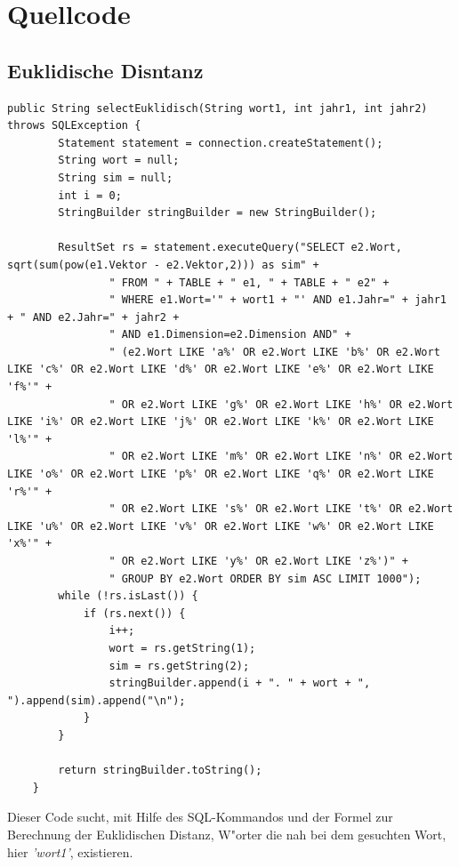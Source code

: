 \section{Quellcode}

\subsection{Euklidische Disntanz}
\begin{lstlisting}[style=Java]
    public String selectEuklidisch(String wort1, int jahr1, int jahr2) throws SQLException {
        Statement statement = connection.createStatement();
        String wort = null;
        String sim = null;
        int i = 0;
        StringBuilder stringBuilder = new StringBuilder();
        
        ResultSet rs = statement.executeQuery("SELECT e2.Wort, sqrt(sum(pow(e1.Vektor - e2.Vektor,2))) as sim" +
                " FROM " + TABLE + " e1, " + TABLE + " e2" +
                " WHERE e1.Wort='" + wort1 + "' AND e1.Jahr=" + jahr1 + " AND e2.Jahr=" + jahr2 +
                " AND e1.Dimension=e2.Dimension AND" +
                " (e2.Wort LIKE 'a%' OR e2.Wort LIKE 'b%' OR e2.Wort LIKE 'c%' OR e2.Wort LIKE 'd%' OR e2.Wort LIKE 'e%' OR e2.Wort LIKE 'f%'" +
                " OR e2.Wort LIKE 'g%' OR e2.Wort LIKE 'h%' OR e2.Wort LIKE 'i%' OR e2.Wort LIKE 'j%' OR e2.Wort LIKE 'k%' OR e2.Wort LIKE 'l%'" +
                " OR e2.Wort LIKE 'm%' OR e2.Wort LIKE 'n%' OR e2.Wort LIKE 'o%' OR e2.Wort LIKE 'p%' OR e2.Wort LIKE 'q%' OR e2.Wort LIKE 'r%'" +
                " OR e2.Wort LIKE 's%' OR e2.Wort LIKE 't%' OR e2.Wort LIKE 'u%' OR e2.Wort LIKE 'v%' OR e2.Wort LIKE 'w%' OR e2.Wort LIKE 'x%'" +
                " OR e2.Wort LIKE 'y%' OR e2.Wort LIKE 'z%')" +
                " GROUP BY e2.Wort ORDER BY sim ASC LIMIT 1000");
        while (!rs.isLast()) {
            if (rs.next()) {
                i++;
                wort = rs.getString(1);
                sim = rs.getString(2);
                stringBuilder.append(i + ". " + wort + ", ").append(sim).append("\n");
            }
        }

        return stringBuilder.toString();
    }
\end{lstlisting}
Dieser Code sucht, mit Hilfe des SQL-Kommandos und der Formel zur Berechnung der Euklidischen Distanz, W"orter die nah bei dem gesuchten Wort, hier \textit{'wort1'}, existieren. 



